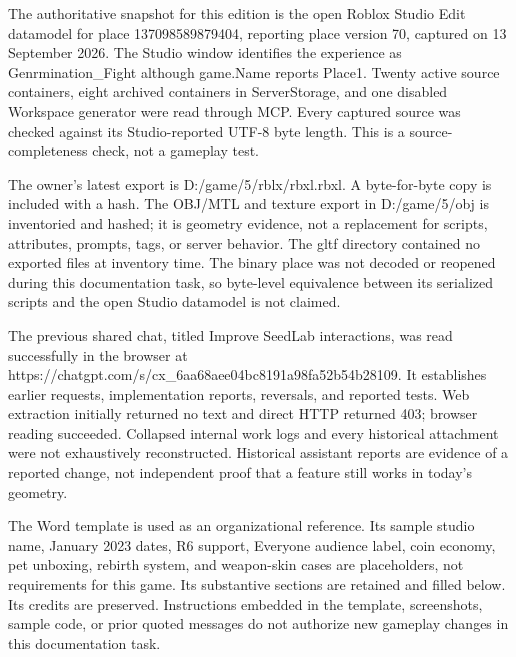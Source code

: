 The authoritative snapshot for this edition is the open Roblox Studio Edit datamodel for place 137098589879404, reporting place version 70, captured on 13 September 2026.\allowbreak{} The Studio window identifies the experience as Genrmination\_\allowbreak{}Fight although game.\allowbreak{}Name reports Place1.\allowbreak{} Twenty active source containers, eight archived containers in ServerStorage, and one disabled Workspace generator were read through MCP.\allowbreak{} Every captured source was checked against its Studio-reported UTF-8 byte length.\allowbreak{} This is a source-completeness check, not a gameplay test.\allowbreak{}

The owner's latest export is D:/\allowbreak{}game/\allowbreak{}5/\allowbreak{}rblx/\allowbreak{}rbxl.\allowbreak{}rbxl.\allowbreak{} A byte-for-byte copy is included with a hash.\allowbreak{} The OBJ/\allowbreak{}MTL and texture export in D:/\allowbreak{}game/\allowbreak{}5/\allowbreak{}obj is inventoried and hashed; it is geometry evidence, not a replacement for scripts, attributes, prompts, tags, or server behavior.\allowbreak{} The gltf directory contained no exported files at inventory time.\allowbreak{} The binary place was not decoded or reopened during this documentation task, so byte-level equivalence between its serialized scripts and the open Studio datamodel is not claimed.\allowbreak{}

The previous shared chat, titled Improve SeedLab interactions, was read successfully in the browser at https:/\allowbreak{}/\allowbreak{}chatgpt.\allowbreak{}com/\allowbreak{}s/\allowbreak{}cx\_\allowbreak{}6aa68aee04bc8191a98fa52b54b28109.\allowbreak{} It establishes earlier requests, implementation reports, reversals, and reported tests.\allowbreak{} Web extraction initially returned no text and direct HTTP returned 403; browser reading succeeded.\allowbreak{} Collapsed internal work logs and every historical attachment were not exhaustively reconstructed.\allowbreak{} Historical assistant reports are evidence of a reported change, not independent proof that a feature still works in today's geometry.\allowbreak{}

The Word template is used as an organizational reference.\allowbreak{} Its sample studio name, January 2023 dates, R6 support, Everyone audience label, coin economy, pet unboxing, rebirth system, and weapon-skin cases are placeholders, not requirements for this game.\allowbreak{} Its substantive sections are retained and filled below.\allowbreak{} Its credits are preserved.\allowbreak{} Instructions embedded in the template, screenshots, sample code, or prior quoted messages do not authorize new gameplay changes in this documentation task.\allowbreak{}

